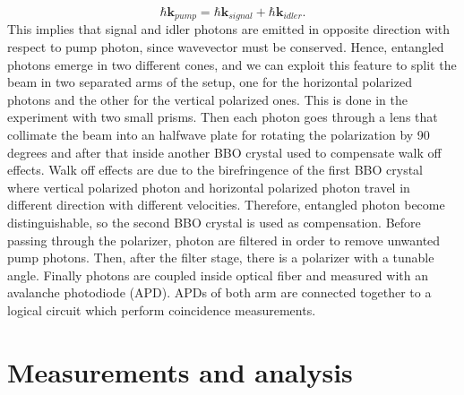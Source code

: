 \documentclass[a4paper,10pt]{article}
\renewcommand{\k}{\mathbf{k}}
\begin{document}
\begin{equation}\hbar \k_{pump} = \hbar \k_{signal} + \hbar\k_{idler}.\end{equation}
This implies that signal and idler photons are emitted in opposite direction with respect to pump photon, since wavevector must be conserved. Hence, entangled photons emerge in two different cones, and we can exploit this feature to split the beam in two separated arms of the setup, one for the horizontal polarized photons and the other for the vertical polarized ones. This is done in the experiment with two small prisms. Then each photon goes through a lens that collimate the beam into an halfwave plate for rotating the polarization by 90 degrees and after that inside another BBO crystal used to compensate walk off effects. Walk off effects are due to the birefringence of the first BBO crystal where vertical polarized photon and horizontal polarized photon travel in different direction with different velocities. Therefore, entangled photon become distinguishable, so the second BBO crystal is used as compensation. Before passing through the polarizer, photon are filtered in order to remove unwanted pump photons. Then, after the filter stage, there is a polarizer with a tunable angle. Finally photons are coupled inside optical fiber and measured with an avalanche photodiode (APD). APDs of both arm are connected together to a logical circuit which perform coincidence measurements. 

\section{Measurements and analysis}
\end{document}

